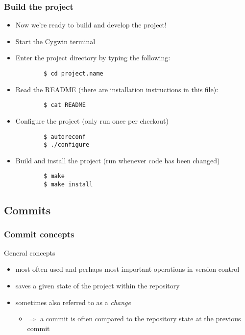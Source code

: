 \begin{frame}[fragile]
    \frametitle{Build the project}
    \begin{itemize}
	\item Now we're ready to build and develop the project!
	\item Start the Cygwin terminal
	\item Enter the project directory by typing the following:
	    \begin{lstlisting}
	    $ cd project.name
	    \end{lstlisting}
	\item Read the README (there are installation instructions in this
	    file):
	    \begin{lstlisting}
	    $ cat README
	    \end{lstlisting}
	\item Configure the project (only run once per checkout)
	    \begin{lstlisting}
	    $ autoreconf
	    $ ./configure
	    \end{lstlisting}
	\item Build and install the project (run whenever code has been
	    changed)
	    \begin{lstlisting}
	    $ make
	    $ make install
	    \end{lstlisting}
    \end{itemize}
\end{frame}

\subsection{Commits}

\begin{frame}[fragile]
\frametitle{Commit concepts}

\begin{alertblock}{General concepts}
    \begin{itemize}
        \item most often used and perhaps most important operations in
            version control
        \item saves a given state of the project within the repository
        \item sometimes also referred to as a \emph{change}
            \begin{itemize}
                \item $\Rightarrow$ a commit is often compared to the
                    repository state at the previous commit
            \end{itemize}
    \end{itemize}
\end{alertblock}
\end{frame}

